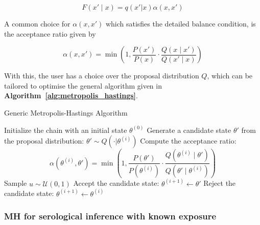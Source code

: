 \documentclass{article}
\begin{document}
\begin{equation}
F(x' \mid x) = q(x' | x)\alpha(x, x')
\end{equation}

A common choice for $\alpha(x, x')$ which satisfies the detailed balance condition, is the acceptance ratio given by 

\begin{equation}
\label{eq:alpha}
        \alpha(x, x') = \min\left(1, \frac{P(x')}{P(x)} \cdot \frac{Q(x \mid x')}{Q(x' \mid x)}\right)
 \end{equation}

With this, the user has a choice over the proposal distribution $Q$, which can be tailored to optimise the general algorithm given in \textbf{Algorithm~\ref{alg:metropolis_hastings}}.

\begin{algorithm}[H]
\caption{Generic Metropolis-Hastings Algorithm}
\label{alg:metropolis_hastings}
\begin{algorithmic}[1]
    \State Initialize the chain with an initial state $\theta^{(0)}$
        \State Generate a candidate state $\theta'$ from the proposal distribution: $\theta' \sim Q(\cdot | \theta^{(i)})$
        \State Compute the acceptance ratio:
        \[
        \alpha(\theta^{(i)}, \theta') = \min\left(1, \frac{P(\theta')}{P(\theta^{(i)})} \cdot \frac{Q(\theta^{(i)} \mid \theta')}{Q(\theta' \mid \theta^{(i)})}\right)
        \]
        \State Sample $u \sim \mathcal{U}(0, 1)$
            \State Accept the candidate state: $\theta^{(i+1)} \leftarrow \theta'$
        \Else
            \State Reject the candidate state: $\theta^{(i+1)} \leftarrow \theta^{(i)}$
        \EndIf
    \EndFor
\end{algorithmic}
\end{algorithm}



\subsubsection{MH for serological inference with known exposure }
\end{document}
